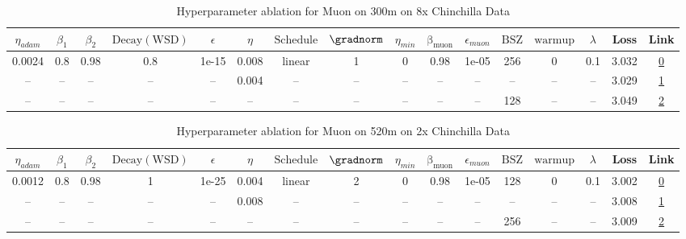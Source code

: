 \begin{table}[H]
\centering
\caption{Hyperparameter ablation for Muon on 300m on 8x Chinchilla Data}
\label{tab:ablation_muon_300m_on_8x_chinchilla_data}
\begin{tabular}{cccccccccccccccc}
\toprule
$\eta_{adam}$ & $\beta_1$ & $\beta_2$ & $\mathrm{Decay (WSD)}$ & $\epsilon$ & $\eta$ & $\mathrm{Schedule}$ & $\gradnorm$ & $\eta_{min}$ & $\mathrm{\beta_{muon}}$ & $\epsilon_{muon}$ & $\mathrm{BSZ}$ & $\mathrm{warmup}$ & $\lambda$ & Loss & Link \\
\midrule
0.0024 & 0.8 & 0.98 & 0.8 & 1e-15 & 0.008 & linear & 1 & 0 & 0.98 & 1e-05 & 256 & 0 & 0.1 & 3.032 & \href{https://wandb.ai/stanford-mercury/optimizer-scaling/runs/sweep-300m-48B-muond28b65lr0.008-wd0.1-minlr0-warmup0-b10.8-b20.-3e14c1}{0} \\
\midrule
-- & -- & -- & -- & -- & 0.004 & -- & -- & -- & -- & -- & -- & -- & -- & 3.029 & \href{https://wandb.ai/stanford-mercury/optimizer-scaling/runs/sweep-300m-48B-muont25115alr0.004-wd0.1-minlr0-warmup0-b10.8-b20-983da2}{1} \\
-- & -- & -- & -- & -- & -- & -- & -- & -- & -- & -- & 128 & -- & -- & 3.049 & \href{https://wandb.ai/stanford-mercury/optimizer-scaling/runs/sweep-300m-48B-muonta4ae77lr0.008-wd0.1-minlr0-warmup0-b10.8-b20-41c572}{2} \\
\bottomrule
\end{tabular}
\end{table}

\begin{table}[H]
\centering
\caption{Hyperparameter ablation for Muon on 520m on 2x Chinchilla Data}
\label{tab:ablation_muon_520m_on_2x_chinchilla_data}
\begin{tabular}{cccccccccccccccc}
\toprule
$\eta_{adam}$ & $\beta_1$ & $\beta_2$ & $\mathrm{Decay (WSD)}$ & $\epsilon$ & $\eta$ & $\mathrm{Schedule}$ & $\gradnorm$ & $\eta_{min}$ & $\mathrm{\beta_{muon}}$ & $\epsilon_{muon}$ & $\mathrm{BSZ}$ & $\mathrm{warmup}$ & $\lambda$ & Loss & Link \\
\midrule
0.0012 & 0.8 & 0.98 & 1 & 1e-25 & 0.004 & linear & 2 & 0 & 0.98 & 1e-05 & 128 & 0 & 0.1 & 3.002 & \href{https://wandb.ai/stanford-mercury/optimizer-scaling/runs/sweep-520m-21B-muon7ace6clr0.004-wd0.1-minlr0-warmup0-b10.8-b20.-748517}{0} \\
\midrule
-- & -- & -- & -- & -- & 0.008 & -- & -- & -- & -- & -- & -- & -- & -- & 3.008 & \href{https://wandb.ai/stanford-mercury/optimizer-scaling/runs/sweep-520m-21B-muon92eab1lr0.008-wd0.1-minlr0-warmup0-b10.8-b20.-02816a}{1} \\
-- & -- & -- & -- & -- & -- & -- & -- & -- & -- & -- & 256 & -- & -- & 3.009 & \href{https://wandb.ai/stanford-mercury/optimizer-scaling/runs/sweep-520m-21B-muonfcc2a8lr0.004-wd0.1-minlr0-warmup0-b10.8-b20.-f61e26}{2} \\
\bottomrule
\end{tabular}
\end{table}

